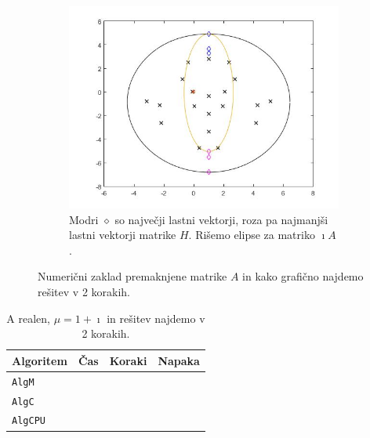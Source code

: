 \documentclass[12pt,a4paper]{amsart}
\theoremstyle{definition}
\theoremstyle{plain}
\begin{document}
\begin{figure}[H]
\begin{subfigure}[t]{0.5\textwidth}
\includegraphics[width=0.9\linewidth]{RC2e2.jpg}
\caption{Modri $\diamond$ so največji lastni vektorji, roza pa najmanjši lastni vektorji matrike $H$\footnotemark[\value{footnote}]. Rišemo elipse za matriko $\imath A$.}
\label{fig:p43}
\end{subfigure}
\caption{Numerični zaklad premaknjene matrike $A$ in kako grafično najdemo rešitev v 2 korakih.}
\end{figure}

\begin{table}[H]
\begin{tabular}{|l|l|c|r|}
\hline
Algoritem & Čas & Koraki & Napaka\\
\hline
\hline
\verb+AlgM+ & & & \\
\hline
\verb+AlgC+ & & & \\
\hline
\verb+AlgCPU+ & & & \\
\hline
\end{tabular}
\caption{A realen, $\mu = 1 + \imath$ in rešitev najdemo v 2 korakih.}
\label{t4}
\end{table}
\end{document}
